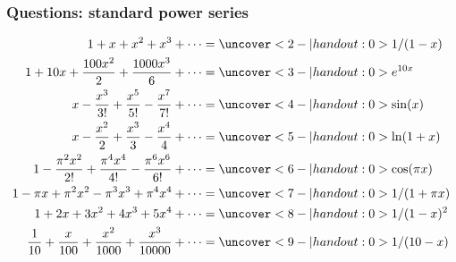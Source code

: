 \documentclass[9pt]{beamer}
\begin{document}
\begin{frame}[t]
 \frametitle{Questions: standard power series}

 \begin{align*}
  1 + x + x^2 + x^3 + \dotsb &=
   \uc<2-| handout:0>{ 1/(1-x)} \\
  1 + 10x + \frac{100x^2}{2} + \frac{1000x^3}{6} + \dotsb &=
   \uc<3-| handout:0>{ e^{10x} }\\
  x - \frac{x^3}{3!} + \frac{x^5}{5!} - \frac{x^7}{7!} + \dotsb &=
   \uc<4-| handout:0>{ \sin(x)} \\
  x - \frac{x^2}{2} + \frac{x^3}{3} - \frac{x^4}{4} + \dotsb &=
   \uc<5-| handout:0>{ \ln(1+x) }\\
  1 - \frac{\pi^2x^2}{2!} + \frac{\pi^4x^4}{4!} - \frac{\pi^6x^6}{6!} + \dotsb &= 
   \uc<6-| handout:0>{\cos(\pi x)} \\ 
  1 - \pi x + \pi^2 x^2 - \pi^3 x^3 + \pi^4 x^4 + \dotsb &= 
   \uc<7-| handout:0>{1/(1+\pi x)} \\
  1 + 2x + 3x^2 + 4x^3 + 5x^4 + \dotsb &=
   \uc<8-| handout:0>{1/(1-x)^2} \\
  \frac{1}{10} + \frac{x}{100} + \frac{x^2}{1000} + \frac{x^3}{10000} + \dotsb &= 
   \uc<9-| handout:0>{1/(10-x)}
 \end{align*}
\end{frame}
\end{document}
